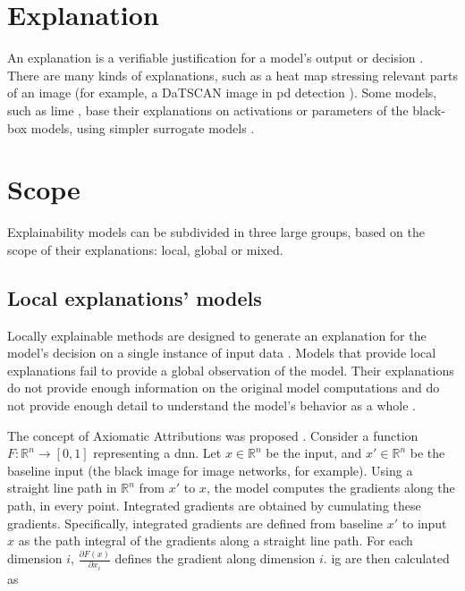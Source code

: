 
\section{Explanation}

An explanation is a verifiable justification for a model's output or decision \cite{XAI}. There are many kinds of explanations, such as a heat map stressing relevant parts of an image (for example, a DaTSCAN image in \gls{pd} detection \cite{LIME_explainability}). Some models, such as \gls{lime} \cite{LIME}, base their explanations on activations or parameters of the black-box models, using simpler surrogate models \cite{XAI}.


\section{Scope}

Explainability models can be subdivided in three large groups, based on the scope of their explanations: local, global or mixed.

\subsection{Local explanations' models}

Locally explainable methods are designed to generate an explanation for the model's decision on a single instance of input data \cite{XAI}. Models that provide local explanations fail to provide a global observation of the model. Their explanations do not provide enough information on the original model computations and do not provide enough detail to understand the model’s behavior as a whole \cite{NAM}. 

The concept of Axiomatic Attributions was proposed \cite{axiomatic_attribution}. Consider a function  $F : \mathbb{R} ^n \rightarrow [0, 1]$ representing a \gls{dnn}. Let $x \in \mathbb{R} ^n$ be the input, and $x' \in \mathbb{R} ^n$ be the baseline input (the black image for image networks, for example). Using a straight line path in $\mathbb{R} ^n$ from $x'$ to $x$, the model computes the gradients along the path, in every point. Integrated gradients are obtained by cumulating these gradients. Specifically, integrated gradients are defined from baseline $x'$ to input $x$ as the path integral of the gradients along a straight line path. For each dimension $i$, $\frac{\partial F(x)}{\partial x_i}$ defines the gradient along dimension $i$. \gls{ig} are then calculated as


